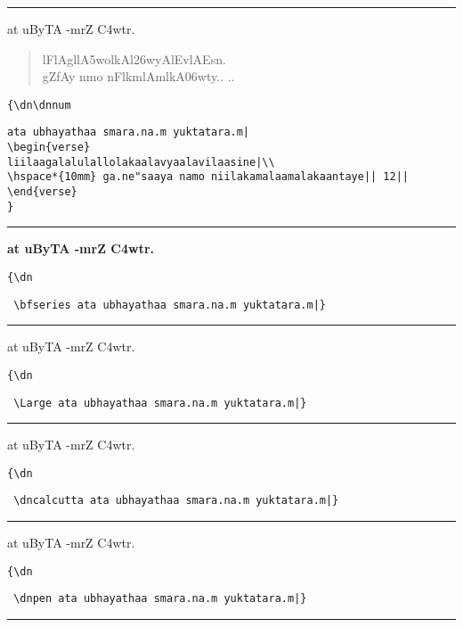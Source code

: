 \documentclass[12pt]{article}
\begin{document}
\hrule
\medskip

{\dn \dnnum
a\-t u\-B\-y\-TA -m\-r\-Z\2 \-\3C4w\-t\-r\2.
\begin{verse}
lF\-lA\-g\-l\-\-l\-\3A5wo\-l\-kA\-l\-\326wyA\-l\-Ev\-lA\-Es\-n\?.\\
\hspace*{10mm} g\-Z\?\-fA\-y n\-mo nF\-l\-k\-m\-lA\-m\-l\-kA\-\306wt\-y\?.. ..
\end{verse}
}

\verb+{\+{\tt dn}\verb+\+{\tt dnnum}
\begin{verbatim}
ata ubhayathaa smara.na.m yuktatara.m|
\begin{verse}
liilaagalalulallolakaalavyaalavilaasine|\\
\hspace*{10mm} ga.ne"saaya namo niilakamalaamalakaantaye|| 12||
\end{verse}
}
\end{verbatim}

\hrule
\medskip

{\dn \bfseries
a\-t u\-B\-y\-TA -m\-r\-Z\2 \-\3C4w\-t\-r\2.
}

\verb+{\+{\tt dn}
\begin{verbatim}
 \bfseries ata ubhayathaa smara.na.m yuktatara.m|}
\end{verbatim}

\hrule
\medskip

{\dn \Large a\-t u\-B\-y\-TA -m\-r\-Z\2 \-\3C4w\-t\-r\2.}

\verb+{\+{\tt dn}
\begin{verbatim}
 \Large ata ubhayathaa smara.na.m yuktatara.m|}
\end{verbatim}

\hrule
\medskip

{\dn \dncalcutta a\-t u\-B\-y\-TA -m\-r\-Z\2 \-\3C4w\-t\-r\2.}

\verb+{\+{\tt dn}
\begin{verbatim}
 \dncalcutta ata ubhayathaa smara.na.m yuktatara.m|}
\end{verbatim}

\hrule
\medskip

{\dn \dnpen a\-t u\-B\-y\-TA -m\-r\-Z\2 \-\3C4w\-t\-r\2.}

\verb+{\+{\tt dn}
\begin{verbatim}
 \dnpen ata ubhayathaa smara.na.m yuktatara.m|}
\end{verbatim}

\newpage
\hrule
\medskip
\end{document}
